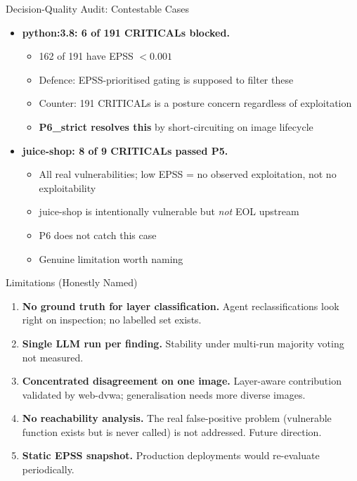 \documentclass[aspectratio=169]{beamer}
\begin{document}
\begin{frame}{Decision-Quality Audit: Contestable Cases}
\begin{itemize}
  \item \textbf{python:3.8: 6 of 191 CRITICALs blocked.}
    \begin{itemize}
      \item 162 of 191 have EPSS $< 0.001$
      \item Defence: EPSS-prioritised gating is supposed to filter these
      \item Counter: 191 CRITICALs is a posture concern regardless of exploitation
      \item \textbf{P6\_strict resolves this} by short-circuiting on image lifecycle
    \end{itemize}

  \medskip
  \item \textbf{juice-shop: 8 of 9 CRITICALs passed P5.}
    \begin{itemize}
      \item All real vulnerabilities; low EPSS = no observed exploitation, not no exploitability
      \item juice-shop is intentionally vulnerable but \emph{not} EOL upstream
      \item P6 does not catch this case
      \item Genuine limitation worth naming
    \end{itemize}
\end{itemize}
\end{frame}

\begin{frame}{Limitations (Honestly Named)}
\begin{enumerate}
  \item \textbf{No ground truth for layer classification.} Agent reclassifications look right on inspection; no labelled set exists.

  \medskip
  \item \textbf{Single LLM run per finding.} Stability under multi-run majority voting not measured.

  \medskip
  \item \textbf{Concentrated disagreement on one image.} Layer-aware contribution validated by web-dvwa; generalisation needs more diverse images.

  \medskip
  \item \textbf{No reachability analysis.} The real false-positive problem (vulnerable function exists but is never called) is not addressed. Future direction.

  \medskip
  \item \textbf{Static EPSS snapshot.} Production deployments would re-evaluate periodically.
\end{enumerate}
\end{frame}
\end{document}
